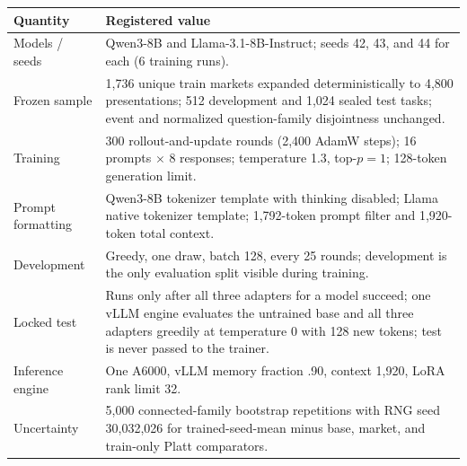 \begin{center}
\begin{minipage}{\linewidth}
\centering
{}
\label{tab:exp3b-extension-hparams}
\scriptsize
\setlength{\tabcolsep}{3pt}
\begin{tabular}{p{.29\linewidth}p{.66\linewidth}}
\toprule
\textbf{Quantity} & \textbf{Registered value} \\
\midrule
Models / seeds & Qwen3-8B and Llama-3.1-8B-Instruct; seeds 42, 43, and 44 for each
(6 training runs). \\
Frozen sample & 1,736 unique train markets expanded deterministically to 4,800
presentations; 512 development and 1,024 sealed test tasks; event and normalized
question-family disjointness unchanged. \\
Training & 300 rollout-and-update rounds (2,400 AdamW steps); 16 prompts $\times$ 8
responses; temperature 1.3, top-$p=1$; 128-token generation limit. \\
Prompt formatting & Qwen3-8B tokenizer template with thinking disabled; Llama
native tokenizer template; 1,792-token prompt filter and 1,920-token total context. \\
Development & Greedy, one draw, batch 128, every 25 rounds; development is the only
evaluation split visible during training. \\
Locked test & Runs only after all three adapters for a model succeed; one vLLM
engine evaluates the untrained base and all three adapters greedily at temperature
0 with 128 new tokens; test is never passed to the trainer. \\
Inference engine & One A6000, vLLM memory fraction .90, context 1,920, LoRA rank
limit 32. \\
Uncertainty & 5,000 connected-family bootstrap repetitions with RNG seed
30,032,026 for trained-seed-mean minus base, market, and train-only Platt
comparators. \\
\bottomrule
\end{tabular}
\end{minipage}
\end{center}

